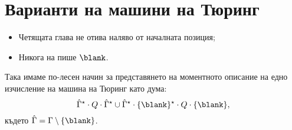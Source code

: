 \section{Варианти на машини на Тюринг}

\begin{itemize}
\item
  Четящата глава не отива наляво от началната позиция;
\item
  Никога на пише $\blank$.
\end{itemize}

Така имаме по-лесен начин за представянето на моментното описание на едно изчисление на машина на Тюринг като дума:
\[\hat{\Gamma}^\star \cdot Q \cdot \hat{\Gamma}^\star \cup \hat{\Gamma}^\star \cdot \{\blank\}^\star \cdot Q \cdot \{\blank\},\]
където $\hat\Gamma = \Gamma \setminus\{\blank\}$.



